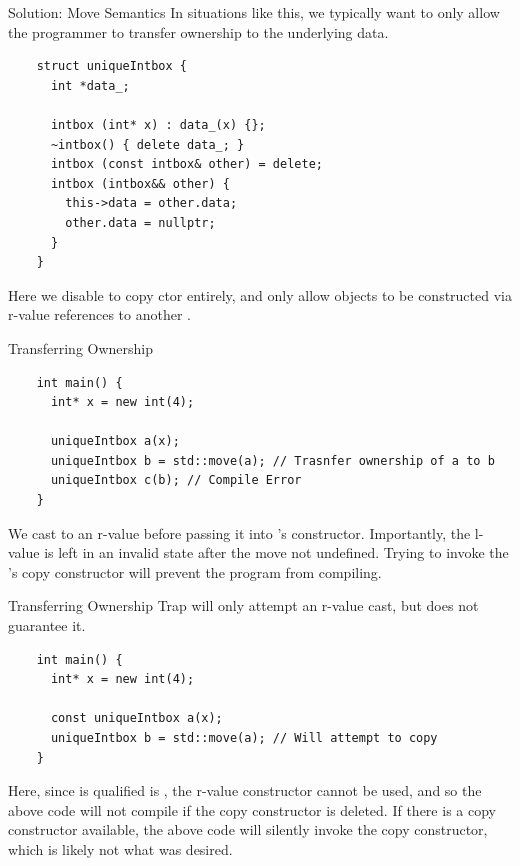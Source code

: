 \begin{frame}[fragile]{Solution: Move Semantics}
  In situations like this, we typically want to only allow the programmer to transfer
  ownership to the underlying data.

  \begin{verbatim}
    struct uniqueIntbox {
      int *data_;

      intbox (int* x) : data_(x) {};
      ~intbox() { delete data_; }
      intbox (const intbox& other) = delete;
      intbox (intbox&& other) {
        this->data = other.data;
        other.data = nullptr;
      }
    }
  \end{verbatim}

  Here we disable to copy ctor entirely, and only allow objects to be constructed via r-value
  references to another .
\end{frame}

\begin{frame}[fragile]{Transferring Ownership}
  \begin{verbatim}
    int main() {
      int* x = new int(4);
      
      uniqueIntbox a(x);
      uniqueIntbox b = std::move(a); // Trasnfer ownership of a to b
      uniqueIntbox c(b); // Compile Error
    }
  \end{verbatim}

  We cast  to an r-value before passing it into 's constructor. Importantly,
  the l-value  is left in an invalid state after the move not undefined. Trying to 
  invoke the 's copy constructor will prevent the program from compiling.
\end{frame}

\begin{frame}[fragile]{Transferring Ownership Trap}
   will only attempt an r-value cast, but does not guarantee it.

  \begin{verbatim}
    int main() {
      int* x = new int(4);

      const uniqueIntbox a(x);
      uniqueIntbox b = std::move(a); // Will attempt to copy
    }
  \end{verbatim}

  Here, since  is qualified is , the r-value constructor cannot be used,
  and so the above code will not compile if the copy constructor is deleted. If there is a copy constructor
  available, the above code will silently invoke the copy constructor, which is likely not what was desired.

\end{frame}


